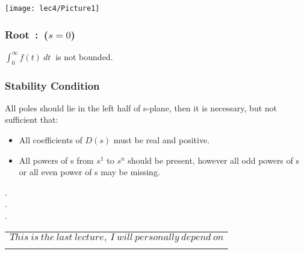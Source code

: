 \begin{figure*}[!h]
	\raggedleft
	\texttt{[image: lec4/Picture1]}
\end{figure*}

\subsubsection{Root\ :\ ($ s = 0 $)}

\centering
$\displaystyle{\int_0^\infty f(t)\ dt\ }$ is not bounded.
\justify
{}

\subsubsection{Stability Condition}

All poles should lie in the left half of s-plane, then it is necessary, but not sufficient that:\\

\begin{itemize}
  \item  All coefficients of $D(s)$ must be real and positive.\\
  \item  All powers of s from $s^1$ to $s^n$ should be present, however all odd powers of s or all even power of s may be missing.\\
\end{itemize}

\centering
\LARGE .\\
\LARGE .\\
\LARGE .\\

\begin{table*}[!b]
	\begin{tabular}{p{16cm}}
		\multicolumn{1}{m{16cm}}{\LARGE{$This\ is\ the\ last\ lecture,\ I\ will\ personally\ depend\ on$}}\\[+1em]
		\multicolumn{1}{r}{
			\fbox{
			    \parbox{8.2cm}{
			    	\LARGE{\href{https://drive.google.com/drive/folders/1G3lhSEKO3itcgrWF_8Sl6ArfrC4g3E8-}{$\ Dr.\ Imtiaz\ Hussain\ Lectures\ $}}
		    	}
			}
		}
		
	\end{tabular}
\end{table*}
